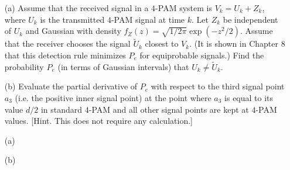 \documentclass{assignment}
\begin{document}
\begin{prob}[6.3]
    \begin{itemize}
        \item[(a)] Assume that the received signal in a $4$-PAM system is $V_k=U_k+Z_k$, where $U_k$ is the transmitted $4$-PAM signal at time $k$. Let $Z_k$ be independent of $U_k$ and Gaussian with density $f_Z(z)=\sqrt{1/2\pi}\exp(-z^2/2)$. Assume that the receiver chooses the signal $\tilde{U}_k$ closest to $V_k$. (It is shown in Chapter 8 that this detection rule minimizes $P_e$ for equiprobable signals.) Find the probability $P_e$ (in terms of Gaussian intervals) that $U_k\neq\tilde{U}_k$.
        \item[(b)] Evaluate the partial derivative of $P_e$ with respect to the third signal point $a_3$ (i.e. the positive inner signal point) at the point where $a_3$ is equal to its value $d/2$ in standard $4$-PAM and all other signal points are kept at $4$-PAM values. [Hint. This does not require any calculation.]
    \end{itemize}
\end{prob}
\begin{sol}
    \begin{itemize}
        \item[(a)] 
        \item[(b)] 
    \end{itemize}
\end{sol}
\end{document}
